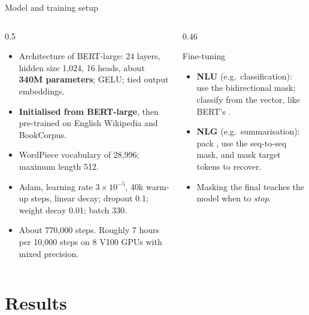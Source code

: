 \documentclass[aspectratio=169,11pt]{beamer}
\begin{document}
\begin{frame}{Model and training setup}
  \begin{columns}[T]
    \begin{column}{0.5\textwidth}
      \small
      \begin{itemize}
        \item Architecture of BERT-large: 24 layers, hidden size 1,024, 16 heads, about \textbf{340M parameters}; GELU; tied output embeddings.
        \item \textbf{Initialised from BERT-large}, then pre-trained on English Wikipedia and BookCorpus.
        \item WordPiece vocabulary of 28,996; maximum length 512.
        \item Adam, learning rate $3\times10^{-5}$, 40k warm-up steps, linear decay; dropout 0.1; weight decay 0.01; batch 330.
        \item About 770,000 steps. Roughly 7 hours per 10,000 steps on 8 V100 GPUs with mixed precision.
      \end{itemize}
    \end{column}
    \begin{column}{0.46\textwidth}
      \begin{block}{Fine-tuning}
        \small
        \begin{itemize}
          \item \textbf{NLU} (e.g.\ classification): use the bidirectional mask; classify from the \code{[SOS]} vector, like BERT's \code{[CLS]}.
          \item \textbf{NLG} (e.g.\ summarisation): pack , use the seq-to-seq mask, and mask target tokens to recover.
          \item Masking the final \code{[EOS]} teaches the model when to \emph{stop}.
        \end{itemize}
      \end{block}
    \end{column}
  \end{columns}
\end{frame}

\section{Results}
\end{document}
